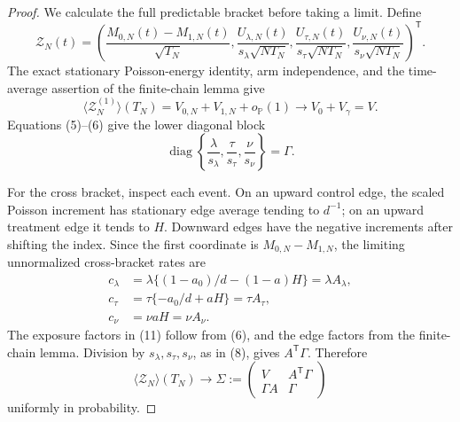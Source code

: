 \documentclass{article}
\begin{document}
\begin{proof}
We calculate the full predictable bracket before taking a limit.  Define
\[
 \mathcal Z_N(t)=\left(
 \frac{M_{0,N}(t)-M_{1,N}(t)}{\sqrt{T_N}},
 \frac{U_{\lambda,N}(t)}{s_\lambda\sqrt{NT_N}},
 \frac{U_{\tau,N}(t)}{s_\tau\sqrt{NT_N}},
 \frac{U_{\nu,N}(t)}{s_\nu\sqrt{NT_N}}
 \right)^{\mathsf T}.                                        \tag{8}
\]
The exact stationary Poisson-energy identity, arm independence, and the time-average assertion of the finite-chain lemma give
\[
 \langle\mathcal Z_N^{(1)}\rangle(T_N)
 =V_{0,N}+V_{1,N}+o_{\mathbb P}(1)
 \longrightarrow V_0+V_\gamma=V.                             \tag{9}
\]
Equations (5)--(6) give the lower diagonal block
\[
 \operatorname{diag}\left\{\frac\lambda{s_\lambda},
 \frac\tau{s_\tau},\frac\nu{s_\nu}\right\}=\Gamma.       \tag{10}
\]

For the cross bracket, inspect each event.  On an upward control edge, the scaled Poisson increment has stationary edge average tending to \(d^{-1}\); on an upward treatment edge it tends to \(H\).  Downward edges have the negative increments after shifting the index.  Since the first coordinate is \(M_{0,N}-M_{1,N}\), the limiting unnormalized cross-bracket rates are
\[
 \begin{split}
 c_\lambda&=\lambda\{(1-a_0)/d-(1-a)H\}=\lambda A_\lambda,\\
 c_\tau&=\tau\{-a_0/d+aH\}=\tau A_\tau,\\
 c_\nu&=\nu aH=\nu A_\nu.                                  \tag{11}
 \end{split}
\]
The exposure factors in (11) follow from (6), and the edge factors from the finite-chain lemma.  Division by \(s_\lambda,s_\tau,s_\nu\), as in (8), gives \(A^{\mathsf T}\Gamma\).  Therefore
\[
 \langle\mathcal Z_N\rangle(T_N)
 \longrightarrow
 \Sigma:=\begin{pmatrix}V&A^{\mathsf T}\Gamma\\
                         \Gamma A&\Gamma\end{pmatrix}        \tag{12}
\]
uniformly in probability.


\end{proof}
\end{document}
